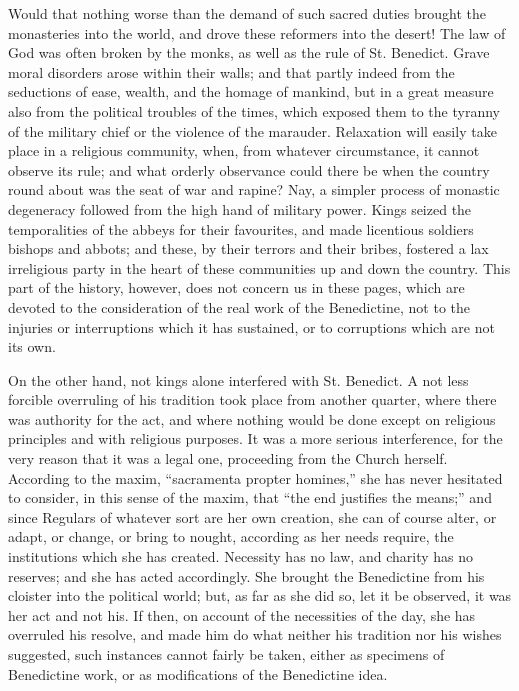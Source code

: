 Would that nothing worse than the demand of such sacred
duties brought the monasteries into the world, and drove these
reformers into the desert! The law of God was often broken by the
monks, as well as the rule of St. Benedict. Grave moral disorders
arose within their walls; and that partly indeed from the seductions
of ease, wealth, and the homage of mankind, but in a great measure
also from the political troubles of the times, which exposed them to
the tyranny of the military chief or the violence of the marauder.
Relaxation will easily take place in a religious community, when, from
whatever circumstance, it cannot observe its rule; and what orderly
observance could there be when the country round about was the seat of
war and rapine? Nay, a simpler process of monastic degeneracy followed
from the high hand of military power. Kings seized the temporalities
of the abbeys for their favourites, and made licentious soldiers
bishops and abbots; and these, by their terrors and their bribes,
fostered a lax irreligious party in the heart of these communities up
and down the country. This part of the history, however, does not
concern us in these pages, which are devoted to the consideration of
the real work of the Benedictine, not to the injuries or interruptions
which it has sustained, or to corruptions which are not its own.

On the other hand, not kings alone interfered with St. Benedict. A
not less forcible overruling of his tradition took place from another
quarter, where there was authority for the act, and where nothing
would be done except on religious principles and with religious
purposes. It was a more serious interference, for the very reason that
it was a legal one, proceeding from the Church herself. According to
the maxim, ``sacramenta propter homines,'' she has never
hesitated to consider, in this sense of the maxim, that ``the end
justifies the means;'' and since Regulars of whatever sort
are her own creation, she can of course alter, or adapt, or change, or
bring to nought, according as her needs require, the institutions
which she has created. Necessity has no law, and charity has no
reserves; and she has acted accordingly. She brought the Benedictine
from his cloister into the political world; but, as far as she did so,
let it be observed, it was her act and not his. If then, on account of
the necessities of the day, she has overruled his resolve, and made
him do what neither his tradition nor his wishes suggested, such
instances cannot fairly be taken, either as specimens of Benedictine
work, or as modifications of the Benedictine idea.

